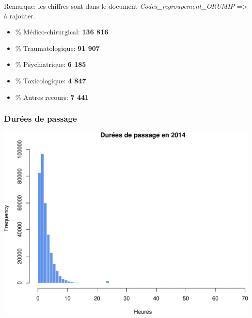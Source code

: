\documentclass[]{article}
\begin{document}
Remarque: les chiffres sont dans le document
\emph{Codes\_regroupement\_ORUMIP} =\textgreater{} à rajouter.

\begin{itemize}
\itemsep1pt\parskip0pt
\item
  \% Médico-chirurgical: \textbf{136 816}
\item
  \% Traumatologique: \textbf{91 907}
\item
  \% Psychiatrique: \textbf{6 185}
\item
  \% Toxicologique: \textbf{4 847}
\item
  \% Autres recours: \textbf{7 441}
\end{itemize}

\subsubsection{Durées de passage}\label{durees-de-passage}

\includegraphics{rapport2014_V4_files/figure-latex/passages-1.pdf}
\end{document}
